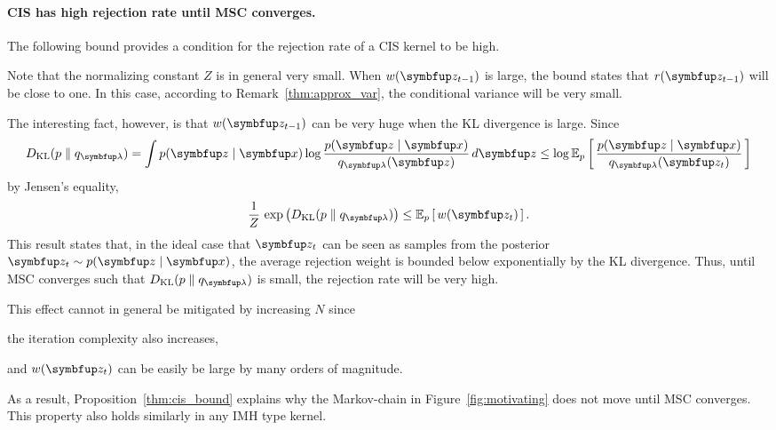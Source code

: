\paragraph{CIS has high rejection rate until MSC converges.}
The following bound provides a condition for the rejection rate of a CIS kernel to be high.
%

%
Note that the normalizing constant \(Z\) is in general very small.
When \(w(\vz_{t-1})\) is large, the bound states that \(r(\vz_{t-1})\) will be close to one.
In this case, according to Remark~\ref{thm:approx_var}, the conditional variance will be very small.

The interesting fact, however, is that \(w(\vz_{t-1})\) can be very huge when the KL divergence is large.
Since
\begin{align}
  \DKL{p}{q_{\vlambda}} = \int p(\vz\mid\vx) \log \frac{p(\vz\mid\vx)}{q_{\vlambda}(\vz)} \, d\vz
  \leq \log \Esub{p}{\frac{p(\vz\mid\vx)}{q_{\vlambda}(\vz_t)}}
\end{align}
by Jensen's equality, 
\begin{align}
  \frac{1}{Z}\,\exp\big(\DKL{p}{q_{\vlambda}}\big) \leq \Esub{p}{w(\vz_{t})}.
\end{align}
This result states that, in the ideal case that \(\vz_t\) can be seen as samples from the posterior \(\vz_t \sim p(\vz\mid\vx)\), the average rejection weight is bounded below exponentially by the KL divergence.
Thus, until MSC converges such that \(\DKL{p}{q_{\vlambda}}\) is small, the rejection rate will be very high.

This effect cannot in general be mitigated by increasing \(N\) since
\begin{enumerate*}[label=(\roman*)]
  \item the iteration complexity also increases,
  \item and \(w(\vz_t)\) can be easily be large by many orders of magnitude.
\end{enumerate*}
As a result, Proposition~\ref{thm:cis_bound} explains why the Markov-chain in Figure~\ref{fig:motivating} does not move until MSC converges.
This property also holds similarly in any IMH type kernel.


